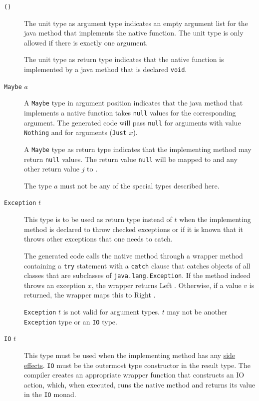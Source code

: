 \begin{description}
\item[\texttt{()}] The unit type as argument type indicates an empty argument list for the java method that implements the native function. The unit type is only allowed if there is exactly one argument.

The unit type as return type indicates that the native function is implemented by a java method that is declared \texttt{void}.

\item[\texttt{Maybe} $a$] A \texttt{Maybe} type in argument position indicates that the java method that implements a native function takes \texttt{null} values for the corresponding argument. The generated code will pass \texttt{null} for arguments with value \texttt{Nothing} and  for arguments (\texttt{Just} $x$).

A \texttt{Maybe} type as return type indicates that the implementing method may return \texttt{null} values. The return value \texttt{null} will be mapped to  and any other return value $j$ to .

The type $a$ must not be any of the special types described here.

\item[\texttt{Exception} $t$] This type is to be used as return type instead of $t$ when the implementing method is declared to throw checked exceptions or if it is known that it throws other exceptions that one needs to catch.

The generated code calls the native method through a wrapper method containing a \texttt{try} statement with a \texttt{catch} clause that catches objects of all classes that are subclasses of \texttt{java.lang.Exception}.
If the method indeed throws an exception $x$, the wrapper returns  {Left} {}.
Otherwise, if a value $v$ is returned, the wrapper maps this to
 {Right} {}.

\texttt{Exception} $t$ is not valid for argument types. $t$ may not be another \texttt{Exception} type or an \texttt{IO} type.

\item[\texttt{IO} $t$] This type must be used when the implementing method has any \hyperref[pure]{side effects}. \texttt{IO} must be the outermost type constructor in the result type. The compiler creates an appropriate wrapper function that constructs an IO action, which, when executed, runs the native method and returns its value in the \texttt{IO} monad.

\end{description}

